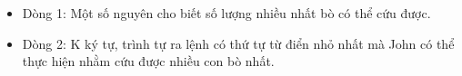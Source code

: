 \begin{itemize}
	\item     Dòng 1: Một số nguyên cho biết số lượng nhiều nhất bò có thể cứu được.   
	\item     Dòng 2: K ký tự, trình tự ra lệnh có thứ tự từ điển nhỏ nhất mà John có thể thực hiện nhằm cứu được nhiều con bò nhất.   
\end{itemize}